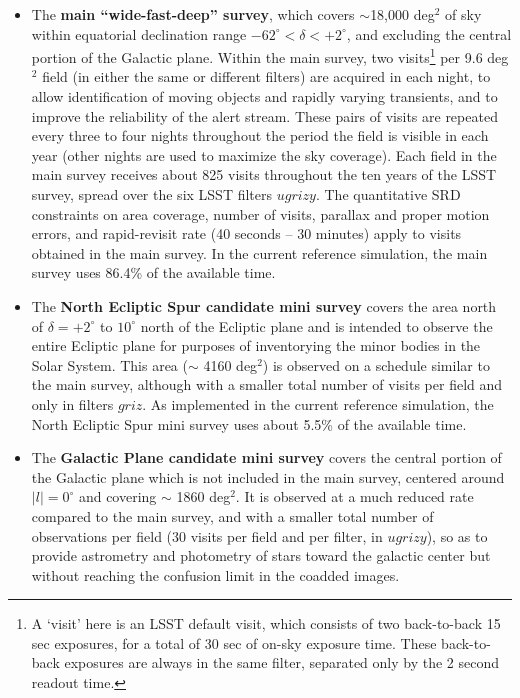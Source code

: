 \documentclass[DM,lsstdraft,toc,usenatbib]{lsstdoc}
\begin{document}
\begin{itemize}
\item The {\bf main ``wide-fast-deep'' survey}, which covers $\sim$18,000 deg$^2$ of sky within equatorial declination
range $-62^\circ < \delta < +2^\circ$, and excluding the central portion of the Galactic 
plane. Within the main survey, two visits\footnote{A `visit' here is an LSST default visit, which 
consists of two back-to-back 15 sec exposures, for a total of 30 sec of on-sky exposure time. These back-to-back exposures are always
in the same filter, separated only by the 2 second readout time.} 
per 9.6 deg$^2$ field (in either the same or different filters) are acquired in each night, to allow identification of moving objects and rapidly varying transients, and to improve
the reliability of the alert stream. These pairs of visits are repeated every three to four nights throughout the period the field is visible in each year (other nights are used to maximize the sky coverage). Each
field in the main survey receives about 825 visits throughout the ten years of the LSST survey, spread over the six LSST filters 
$ugrizy$. The quantitative SRD constraints on area coverage, number of visits, parallax and proper motion errors, and 
rapid-revisit rate (40 seconds -- 30 minutes) apply to visits obtained in the main survey. 
In the current reference simulation, the main survey uses 86.4\% of the available time.
\item The {\bf North Ecliptic Spur candidate mini survey} covers the area north of $\delta = +2^\circ$ to $10^\circ$ north of the Ecliptic plane
and is intended to observe the entire Ecliptic plane for purposes of inventorying the minor bodies in the Solar System. This area ($\sim$ 4160 deg$^2$) 
is observed on a schedule similar to the main survey, although with a smaller total number of visits per field and only in filters $griz$. 
As implemented in the current reference simulation, the North Ecliptic Spur mini survey uses about 5.5\% of the available time. 
\item The {\bf Galactic Plane candidate mini survey} covers the central portion of the Galactic plane which is not included in the main survey, 
centered around $|l| = 0^\circ$ and covering $\sim$ 1860 deg$^2$.  It is observed at a much reduced rate compared to the main survey, 
and with a smaller total number of observations per field (30 visits per field and per filter, in $ugrizy$), so as to
provide astrometry and photometry of stars toward the galactic center but without reaching the confusion limit in the coadded images.

\end{itemize}
\end{document}
